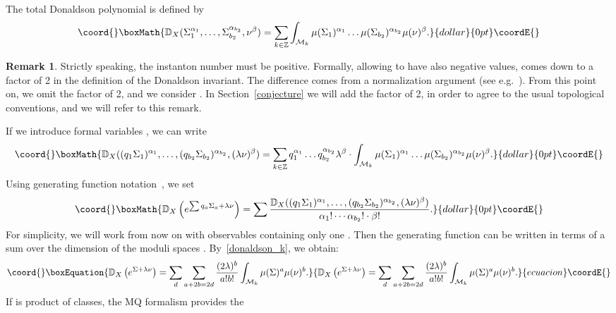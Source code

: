 \documentclass[a4paper,12pt,reqno,sumlimits]{amsart}
\theoremstyle{plain}
\theoremstyle{definition}
\newtheorem{rem}[thm]{Remark}
\providecommand{\D}{{\mathbb D}}
\providecommand{\Z}{{\mathbb Z}}
\providecommand{\1}{{\bf 1}}
\providecommand{\calM}{{\mathcal M}}
\providecommand{\calO}{{\mathcal O}}
\numberwithin{equation}{section}
\begin{document}
The total Donaldson polynomial is defined by
$$\coord{}\boxMath{
\D_X(\Sigma_1^{\alpha_1},\dots,\Sigma_{b_2}^{\alpha_{b_2}},\nu^\beta)
=\sum_{k\in\Z}\int_{\calM_k}\mu(\Sigma_1)^{\alpha_1}\dots
\mu(\Sigma_{b_2})^{\alpha_{b_2}}\mu(\nu)^\beta.
}{dollar}{0pt}\coordE{}$$
\begin{rem}
  \label{thetwofactor}
  Strictly speaking, the instanton number \coordHE{} must be positive.  Formally,
  allowing \coordHE{} to have also negative values, comes down to a factor of 2 in
  the definition of the Donaldson invariant.  The difference comes from a
  normalization argument (see e.g.~\cite[(2.18)]{ewdon2}). From this point
  on, we omit the factor of 2, and we consider \myHighlight{$k\in\Z$}\coordHE{}. In
  Section~\ref{conjecture} we will add the factor of 2, in order to agree to
  the usual topological conventions, and we will refer to this remark.
\end{rem}
\noindent If we introduce formal variables \coordHE{}, we can write
$$\coord{}\boxMath{
\D_X((q_1\Sigma_1)^{\alpha_1},\dots,(q_{b_2}\Sigma_{b_2})^{\alpha_{b_2}},
(\lambda\nu)^\beta)=\sum_{k\in\Z}q_1^{\alpha_1}\dots q_{b_2}^{\alpha_{b_2}}
\lambda^\beta\cdot\int_{\calM_k}\mu(\Sigma_1)^{\alpha_1}\dots
\mu(\Sigma_{b_2})^{\alpha_{b_2}}\mu(\nu)^\beta.
}{dollar}{0pt}\coordE{}$$
Using generating function notation~\cite{ewdon}, we set
$$\coord{}\boxMath{
\D_X\left(e^{\sum q_a\Sigma_a+\lambda\nu}\right)=
\sum \frac{\D_X((q_1\Sigma_1)^{\alpha_1},\dots,(q_{b_2}
  \Sigma_{b_2})^{\alpha_{b_2}},(\lambda\nu)^\beta)}{\alpha_1!\cdots
  \alpha_{b_2}!\cdot\beta!}.
}{dollar}{0pt}\coordE{}$$
For simplicity, we will work from now on with observables \myHighlight{$\calO$}\coordHE{}
containing only one \myHighlight{$\Sigma$}\coordHE{}. Then the generating function can be written in
terms of a sum over the dimension \coordHE{} of the moduli spaces \myHighlight{$\calM_k$}\coordHE{}.
By~\eqref{donaldson_k}, we obtain:
\begin{equation}\coord{}\boxEquation{
  \label{dwgeneratingfunction}
  \D_X\left(e^{\Sigma+\lambda\nu}\right)=
  \sum_{d}\sum_{a+2b=2d}\frac{(2\lambda)^b}{a!b!}
  \int_{\calM_k}\mu(\Sigma)^{a}\mu(\nu)^b.
}{
  \D_X\left(e^{\Sigma+\lambda\nu}\right)=
  \sum_{d}\sum_{a+2b=2d}\frac{(2\lambda)^b}{a!b!}
  \int_{\calM_k}\mu(\Sigma)^{a}\mu(\nu)^b.
}{ecuacion}\coordE{}\end{equation}
If \myHighlight{$\calO$}\coordHE{} is product of \myHighlight{$\mu$}\coordHE{} classes, the MQ formalism provides the
\end{document}
